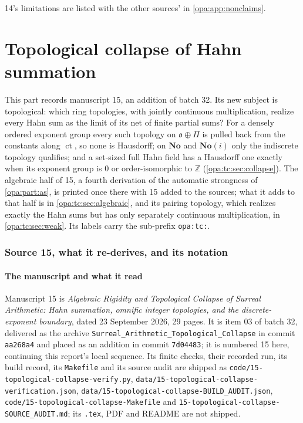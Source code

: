 \documentclass[11pt,oneside]{article}
\numberwithin{equation}{section}
\theoremstyle{definition}
\theoremstyle{remark}
\newcommand{\No}{\mathbf{No}}
\newcommand{\SC}{\mathbf{No}(i)}
\newcommand{\Z}{\mathbb Z}
\newcommand{\oo}{\mathfrak o}
\newcommand{\ct}{\operatorname{ct}}
\newcommand{\lbl}[1]{\nolinkurl{#1}}
\newcommand{\fn}[1]{\nolinkurl{#1}}
\begin{document}
14's limitations are listed with the other sources' in \cref{opa:app:nonclaims}.

\part{Topological collapse of Hahn summation}\label{opa:tc:part}

This part records manuscript 15, an addition of batch 32. Its new subject is topological: which ring
topologies, with jointly continuous multiplication, realize every Hahn sum as the limit of its net of
finite partial sums? For a densely ordered exponent group every such topology on
$\oo\oplus\Pi$ is pulled back from the constants along $\ct$, so none is Hausdorff; on $\No$ and $\SC$
only the indiscrete topology qualifies; and a set-sized full Hahn field has a Hausdorff one exactly
when its exponent group is $0$ or order-isomorphic to $\Z$ (\cref{opa:tc:sec:collapse}). The algebraic
half of 15, a fourth derivation of the automatic strongness of \cref{opa:part:as}, is printed once
there with 15 added to the sources; what it adds to that half is in \cref{opa:tc:sec:algebraic}, and
its pairing topology, which realizes exactly the Hahn sums but has only separately continuous
multiplication, in \cref{opa:tc:sec:weak}. Its labels carry the sub-prefix \lbl{opa:tc:}.

\section{Source 15, what it re-derives, and its notation}\label{opa:tc:sec:intro}

\subsection{The manuscript and what it read}\label{opa:tc:sub:source}

Manuscript 15 is \emph{Algebraic Rigidity and Topological Collapse of Surreal Arithmetic: Hahn
summation, omnific integer topologies, and the discrete-exponent boundary}, dated 23 September 2026,
29 pages. It is item 03 of batch 32, delivered as the archive
\fn{Surreal_Arithmetic_Topological_Collapse} in commit \texttt{aa268a4} and placed as an addition in
commit \texttt{7d04483}; it is numbered 15 here, continuing this report's local sequence. Its finite
checks, their recorded run, its build record, its \fn{Makefile} and its source audit are shipped as
\fn{code/15-topological-collapse-verify.py}, \fn{data/15-topological-collapse-verification.json},
\fn{data/15-topological-collapse-BUILD_AUDIT.json}, \fn{code/15-topological-collapse-Makefile} and
\fn{15-topological-collapse-SOURCE_AUDIT.md}; its \fn{.tex}, PDF and README are not shipped.
\end{document}
